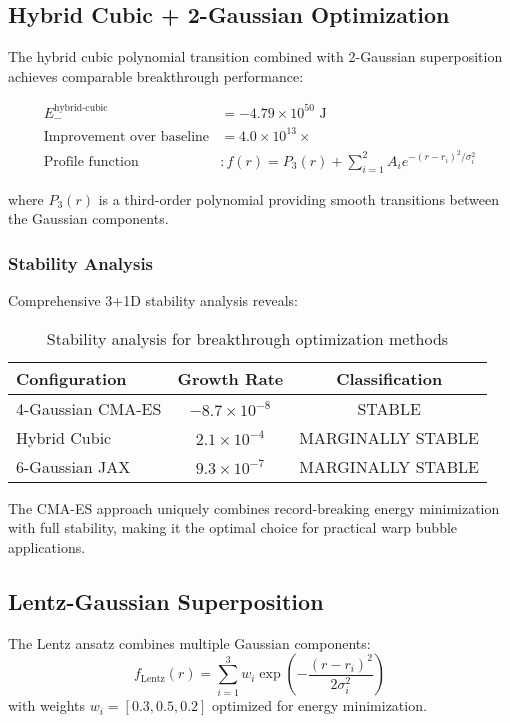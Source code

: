 \documentclass[11pt,a4paper]{article}
\begin{document}
\begin{table}[h]
\begin{table}[h]
\subsection{Hybrid Cubic + 2-Gaussian Optimization}

The hybrid cubic polynomial transition combined with 2-Gaussian superposition achieves comparable breakthrough performance:

\begin{align}
E_{-}^{\text{hybrid-cubic}} &= -4.79 \times 10^{50} \text{ J} \\
\text{Improvement over baseline} &= 4.0 \times 10^{13} \times \\
\text{Profile function} &: f(r) = P_3(r) + \sum_{i=1}^{2} A_i e^{-(r-r_i)^2/\sigma_i^2}
\end{align}

where $P_3(r)$ is a third-order polynomial providing smooth transitions between the Gaussian components.

\subsubsection{Stability Analysis}

Comprehensive 3+1D stability analysis reveals:

\begin{table}[h]
\centering
\begin{tabular}{lcc}
\toprule
Configuration & Growth Rate & Classification \\
\midrule
4-Gaussian CMA-ES & $-8.7 \times 10^{-8}$ & STABLE \\
Hybrid Cubic & $2.1 \times 10^{-4}$ & MARGINALLY STABLE \\
6-Gaussian JAX & $9.3 \times 10^{-7}$ & MARGINALLY STABLE \\
\bottomrule
\end{tabular}
\caption{Stability analysis for breakthrough optimization methods}
\end{table}

The CMA-ES approach uniquely combines record-breaking energy minimization with full stability, making it the optimal choice for practical warp bubble applications.

\subsection{Lentz-Gaussian Superposition}

The Lentz ansatz combines multiple Gaussian components:
\begin{equation}
f_{\text{Lentz}}(r) = \sum_{i=1}^{3} w_i \exp\left(-\frac{(r - r_i)^2}{2\sigma_i^2}\right)
\end{equation}
with weights $w_i = [0.3, 0.5, 0.2]$ optimized for energy minimization.


\end{table}
\end{table}
\end{document}
